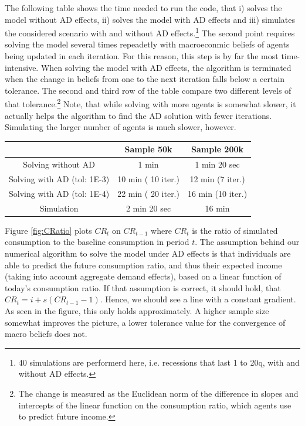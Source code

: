 \documentclass[]{article}
\begin{document}
The following table shows the time needed to run the code, that i) solves the model without AD effects, ii) solves the model with AD effects and iii) simulates the considered scenario with and without AD effects.\footnote{40 simulations are performerd here, i.e. recessions that last 1 to 20q, with and without AD effects.} The second point requires solving the model several times repeadetly with macroeconmic beliefs of agents being updated in each iteration. For this reason, this step is by far the most time-intensive. When solving the model with AD effects, the algorithm is terminated when the change in beliefs from one to the next iteration falls below a certain tolerance. The second and third row of the table compare two different levels of that tolerance.\footnote{The change is measured as the Euclidean norm of the difference in slopes and intercepts of the linear function on the consumption ratio, which agents use to predict future income.} Note, that while solving with more agents is somewhat slower, it actually helps the algorithm to find the AD solution with fewer iterations. Simulating the larger number of agents is much slower, however.

\begin{center}
	\begin{tabular}{||c| c |c||} 
		\hline
		  & Sample 50k & Sample 200k \\ [0.5ex] 
		\hline\hline
		Solving without AD &  1 min & 1 min 20 sec  \\ \hline
		Solving with AD (tol: 1E-3) &  10 min ( 10 iter.)  & 12 min (7 iter.)  \\ \hline
		Solving with AD (tol: 1E-4) &  22 min ( 20 iter.)  & 16 min (10 iter.)  \\ \hline
		Simulation & 2 min 20 sec  & 16 min \\ [1ex] 
		\hline
	\end{tabular}
\end{center}

Figure \ref{fig:CRatio} plots $CR_t$ on  $CR_{t-1}$ where $CR_t$ is the ratio of simulated consumption to the baseline consumption in period $t$. The assumption behind our numerical algorithm to solve the model under AD effects is that individuals are able to predict the future consumption ratio, and thus their expected income (taking into account aggregate demand effects), based on a linear function of today's consumption ratio. If that assumption is correct, it should hold, that $CR_t = i + s (CR_{t-1} - 1 )$. Hence, we should see a line with a constant gradient. As seen in the figure, this only holds approximately. A higher sample size somewhat improves the picture, a lower tolerance value for the convergence of macro beliefs does not.
\end{document}
